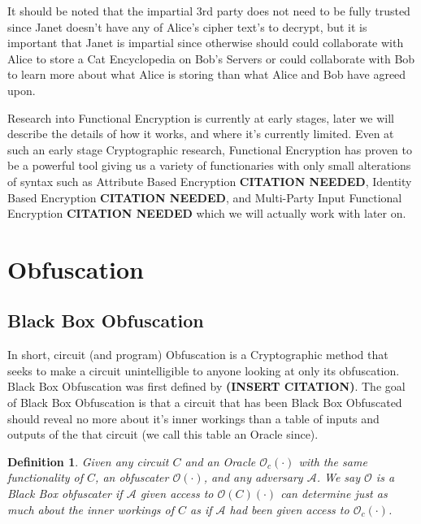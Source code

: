 \documentclass[12pt,twoside]{reedthesis}
\newtheorem{definition}{Definition}
\begin{document}
\par It should be noted that the impartial 3rd party does not need to be fully trusted since Janet doesn't have any of Alice's cipher text's to decrypt, but it is important that Janet is impartial since otherwise should could collaborate with Alice to store a Cat Encyclopedia on Bob's Servers or could collaborate with Bob to learn more about what Alice is storing than what Alice and Bob have agreed upon.


\par Research into Functional Encryption is currently at early stages, later we will describe the details of how it works, and where it's currently limited. Even at such an early stage Cryptographic research, Functional Encryption has proven to be a powerful tool giving us a variety of functionaries with only small alterations of syntax such as Attribute Based Encryption \textbf{CITATION NEEDED}, Identity Based Encryption \textbf{CITATION NEEDED}, and Multi-Party Input Functional Encryption \textbf{CITATION NEEDED} which we will actually work with later on. 

    
    

    \section{Obfuscation}
    
    \subsection{Black Box Obfuscation}
    In short, circuit (and program) Obfuscation is a Cryptographic method that seeks to make a circuit
    unintelligible to anyone looking at only its obfuscation. Black Box Obfuscation was first defined by
    \textbf{(INSERT CITATION)}. The goal of Black Box Obfuscation is that a circuit that has been Black Box Obfuscated should reveal no more about it's inner workings than a table of inputs and outputs of the that circuit (we call this table an Oracle since).
    
    \begin{definition}
    Given any circuit $C$ and an Oracle $\mathcal{O}_c(\cdot)$ with the same functionality of $C$, an obfuscater $\mathcal{O}(\cdot)$, and any adversary $\mathcal{A}$. We say $\mathcal{O}$ is a Black Box obfuscater if $\mathcal{A}$ given access to $\mathcal{O}(C)(\cdot)$ can determine just as much about the inner workings of $C$ as if $\mathcal{A}$ had been given access to $\mathcal{O}_c(\cdot)$.
   
    
    \end{definition}
    
\end{document}
